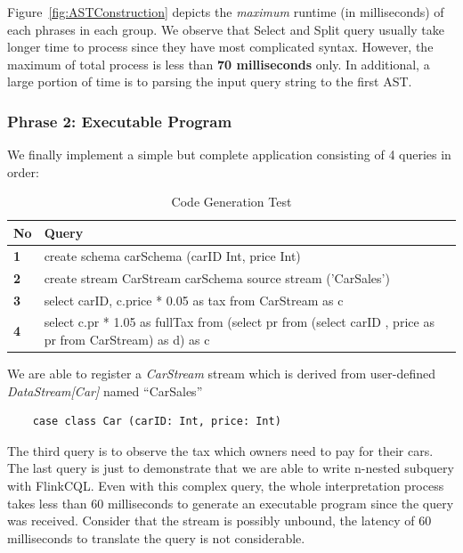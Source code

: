 Figure~\ref{fig:ASTConstruction} depicts the \textit{maximum} runtime (in milliseconds) of each phrases in each group. We observe that Select and Split query usually take longer time to process since they have most complicated syntax. However, the maximum of total process is less than \textbf{70 milliseconds}  only. In additional, a large portion of time is to parsing the input query string to the first AST. 

\subsubsection{Phrase 2: Executable Program}



We finally implement a simple but complete application consisting of 4 queries in order:

\begin{table}[h!]
\caption{Code Generation Test}
\centering
\label{table:GenerationTest}
\setlength\extrarowheight{5pt}
\begin{tabular}{||>{\centering\bfseries}m{0.5in}|>{\centering\arraybackslash}m{5in}||}
\hline
\textbf{No} & \textbf{Query} \\ \hline\hline
     		1 & 	       create schema carSchema (carID Int, price Int)\\ \hline
     		2 & create stream CarStream carSchema source stream ('CarSales')	       \\ \hline
     	3 & 		select carID, c.price * 0.05 as tax from CarStream as c       \\ \hline
     	4 &	select c.pr * 1.05 as fullTax from (select pr from (select carID , price  as pr from CarStream) as d) as c	       \\ \hline
	           				
 \end{tabular}
\end{table}

We are able to register a \textit{CarStream} stream which is derived from user-defined \textit{DataStream[Car]} named ``CarSales''
\begin{lstlisting}
 	case class Car (carID: Int, price: Int)
\end{lstlisting}

The third query is to observe the tax which owners need to pay for their cars. The last query is just to demonstrate that we are able to write n-nested subquery with FlinkCQL. Even with this complex query, the whole interpretation process takes less than 60 milliseconds to generate an executable program since the query was received.  Consider that the stream is possibly unbound, the latency of 60 milliseconds to translate the query is not considerable. 

